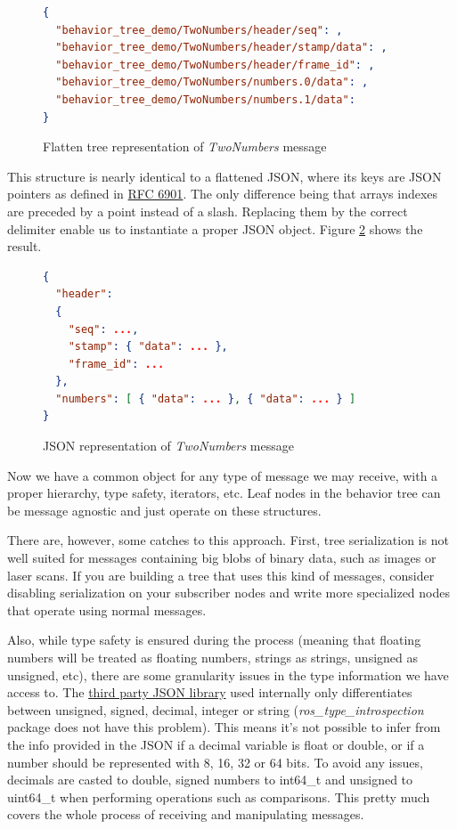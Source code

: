 \documentclass[a4paper,12pt]{article}
\begin{document}
\begin{figure}[ht!]
\centering
\begin{lstlisting}[language=json, basicstyle=\small]
{
  "behavior_tree_demo/TwoNumbers/header/seq": ,
  "behavior_tree_demo/TwoNumbers/header/stamp/data": ,
  "behavior_tree_demo/TwoNumbers/header/frame_id": ,
  "behavior_tree_demo/TwoNumbers/numbers.0/data": ,
  "behavior_tree_demo/TwoNumbers/numbers.1/data":
}
\end{lstlisting}
\caption{Flatten tree representation of \textit{TwoNumbers} message}
\label{figure:two-numbers-tree-flatten}
\end{figure}

This structure is nearly identical to a flattened JSON, where its keys are JSON pointers as defined in \href{https://tools.ietf.org/html/rfc6901}{RFC 6901}. The only difference being that arrays indexes are preceded by a point instead of a slash. Replacing them by the correct delimiter enable us to instantiate a proper JSON object. Figure \ref{figure:two-numbers-tree-json} shows the result.

\begin{figure}[ht!]
\centering
\begin{lstlisting}[language=json, basicstyle=\small]
{
  "header": 
  {
  	"seq": ...,
  	"stamp": { "data": ... },
  	"frame_id": ...
  },
  "numbers": [ { "data": ... }, { "data": ... } ]
}
\end{lstlisting}
\caption{JSON representation of \textit{TwoNumbers} message}
\label{figure:two-numbers-tree-json}
\end{figure}

Now we have a common object for any type of message we may receive, with a proper hierarchy, type safety, iterators, etc. Leaf nodes in the behavior tree can be message agnostic and just operate on these structures.

There are, however, some catches to this approach. First, tree serialization is not well suited for messages containing big blobs of binary data, such as images or laser scans. If you are building a tree that uses this kind of messages, consider disabling serialization on your subscriber nodes and write more specialized nodes that operate using normal messages.

Also, while type safety is ensured during the process (meaning that floating numbers will be treated as floating numbers, strings as strings, unsigned as unsigned, etc), there are some granularity issues in the type information we have access to. The \href{https://github.com/nlohmann/json}{third party JSON library} used internally only differentiates between unsigned, signed, decimal, integer or string (\textit{ros_type_introspection} package does not have this problem). This means it's not possible to infer from the info provided in the JSON if a decimal variable is float or double, or if a number should be represented with 8, 16, 32 or 64 bits. To avoid any issues, decimals are casted to double, signed numbers to int64_t and unsigned to uint64_t when performing operations such as comparisons. This pretty much covers the whole process of receiving and manipulating messages.
\end{document}
